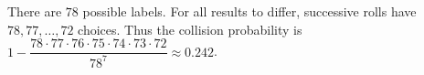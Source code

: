 There are $78$ possible labels. For all results to differ, successive rolls have $78,77,\ldots,72$ choices. Thus the collision probability is $1-\dfrac{78\cdot77\cdot76\cdot75\cdot74\cdot73\cdot72}{78^7}\approx\boxed{0.242}$.
